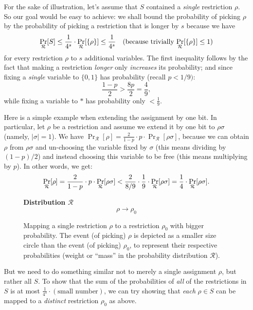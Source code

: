 For the sake of illustration, let's assume that  \( S \) contained a \emph{single} restriction \( \rho \). So our goal would be easy to achieve: we shall bound the probability of picking $\rho$ by the probability of picking a restriction that is longer by  $s$ 
 because we have 
\[
\Pr_{\mathcal{R}}[S] \leq \frac{1}{4^s}\cdot \Pr_{\mathcal{R}}[\{\rho\}] \leq \frac{1}{4^s} 
\quad \text{(because trivially \( \Pr_{\mathcal{R}}[\{\rho\}] \leq 1\))}
\]
for every restriction \( \rho \) to \( s \) additional variables.
The first inequality follows by the fact that making a restriction \emph{longer} 
only \emph{increases} its probability; and  since fixing a \emph{single} variable 
to \( \{0,1\} \) has probability (recall  $p<1/9)$: 
\[
\frac{1 - p}{2} > \frac{8p}{2} = \frac{4}{9},
\]
while fixing a variable to \( * \) has probability only \( < \frac{1}{9} \).

Here is a simple example when extending the assignment by one bit. In particular, let $\rho$ be a restriction and assume we extend it by one bit to $\rho\sigma$ (namely, $|\sigma|=1$). We have 
$\Pr_{\mathcal{R}}[\rho] = \frac{2}{1 - p} \cdot p \cdot \Pr_{\mathcal{R}}[\rho\sigma]$, because we can obtain $\rho$ from $\rho\sigma$ and un-choosing the variable  fixed by $\sigma$ (this means dividing by $(1-p)/2$) and instead choosing this variable to be free (this means multiplying by $p$). In other words, we get:  
\[
\Pr_{\mathcal{R}}[\rho] = \frac{2}{1 - p} \cdot p \cdot \Pr_{\mathcal{R}}[\rho\sigma] 
<  \frac{2}{8/9} \cdot \frac{1}{9} \cdot\Pr_{\mathcal{R}}
[\rho\sigma] = \frac{1}{4}\cdot
 \Pr_{\mathcal{R}}[\rho\sigma].
\]

\begin{figure}
\centering
\textbf{Distribution \( \mathcal{R} \)}
\[
\rho \longrightarrow \rho_0
\]
\caption{Mapping a single restriction \( \rho \) to a restriction \( \rho_0 \) with bigger probability.
The event (of picking) \( \rho \) is depicted as a smaller size circle than the event (of picking) \( \rho_0 \),
to represent their respective probabilities (weight or ``mass'' in the probability distribution \( \mathcal{R} \)).}
\end{figure}
 

But we need to do something similar not to merely a single assignment \( \rho \), but rather all \( S \).
To show that the sum of the probabilities of \emph{all} of the restrictions in \( S \) is at most 
\(\frac{1}{4^s} \cdot (\text{small number})\), we can try showing that \emph{each} \( \rho \in S \) can be mapped to a 
\emph{distinct} restriction \( \rho_0 \) as above. 

